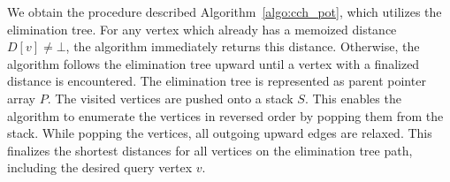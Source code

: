 \documentclass[manuscript]{acmart}
\begin{document}
We obtain the procedure described Algorithm~\ref{algo:cch_pot}, which utilizes the elimination tree.
For any vertex which already has a memoized distance $D[v] \neq \bot$, the algorithm immediately returns this distance.
Otherwise, the algorithm follows the elimination tree upward until a vertex with a finalized distance is encountered.
The elimination tree is represented as parent pointer array $P$.
The visited vertices are pushed onto a stack $S$.
This enables the algorithm to enumerate the vertices in reversed order by popping them from the stack.
While popping the vertices, all outgoing upward edges are relaxed.
This finalizes the shortest distances for all vertices on the elimination tree path, including the desired query vertex $v$.




\end{document}
